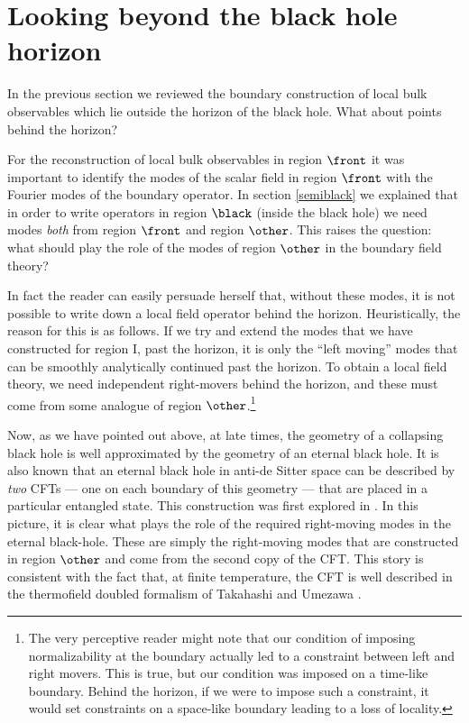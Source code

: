 \section{Looking beyond the black hole horizon \label{sec:behind}}

In the previous section we reviewed the boundary construction of local bulk observables which lie outside the horizon of the black hole. What about points behind the horizon? 

For the reconstruction of local bulk observables in region $\front$ it was important to identify the modes of the scalar field in region $\front$ with the Fourier modes of the boundary operator.  In section \ref{semiblack} we explained that in order to write operators in region $\black$ (inside the black hole) we need modes {\it both} from region $\front$ and region $\other$. This raises the question: what should play the role of the modes of region $\other$ in the boundary field theory?

In fact the reader can easily persuade herself that, without these modes, it is not possible to write down a local field operator behind the horizon. Heuristically, the reason for this is as follows. If we try and extend the modes that we have constructed for region I, past the horizon, it is only the ``left moving'' modes that can be smoothly analytically continued past the horizon. To obtain a local field theory, we need independent right-movers behind the horizon, and these must come from some analogue of region $\other$.\footnote{The very perceptive reader might note that our condition of imposing normalizability at the boundary actually led to a constraint between left and right movers. This is true, but our condition was imposed on a time-like boundary. Behind the horizon, if we were to impose such a constraint, it would set constraints on a space-like boundary leading to a loss of locality.}


Now, as we have pointed out above, at late times, the geometry of a collapsing black hole is well approximated by the geometry of an eternal black hole. It is also known that an eternal black hole in anti-de Sitter space can be described by {\em two} CFTs --- one on each boundary of this geometry --- that are placed in a particular entangled state. This construction was first explored in \cite{Maldacena:2001kr}. In this picture, it is clear what plays the role of the required right-moving modes in the eternal black-hole. These are simply the right-moving modes that are constructed in region $\other$ and come from the second copy of the CFT. This story is consistent with the fact that, at finite temperature, the CFT is well described in the thermofield doubled formalism of Takahashi and Umezawa \cite{takahashi1996thermo}. 

